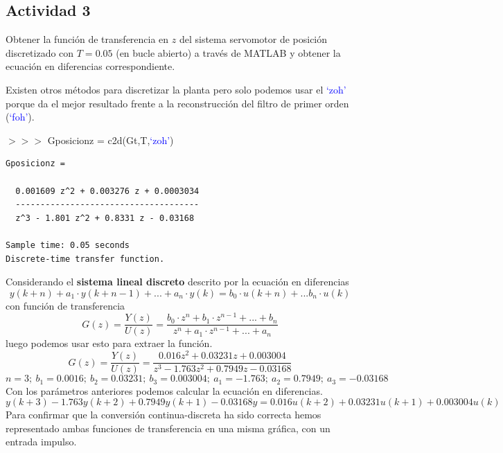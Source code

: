 \subsection{Actividad 3}
Obtener la función de transferencia en $z$ del sistema
servomotor de posición discretizado con $T=0.05$ (en bucle abierto) a
través de \textsc{MATLAB} y obtener la ecuación en diferencias
correspondiente.

Existen otros métodos para discretizar la planta pero solo podemos
usar el \textcolor{blue}{`zoh'} porque da el mejor resultado frente a
la reconstrucción del filtro de primer orden
(\textcolor{blue}{`foh'}).

\begin{tcolorbox}[sharp corners, colframe=bluebox, title= Función de
  transferencia en $z$.]
 $>>>$ Gposicionz = c2d(Gt,T,\textcolor{blue}{`zoh'})
  \vspace*{0.5em}
  \begin{tcolorbox}[sharp corners, colback = white]
    \color{gray}
\begin{verbatim}
Gposicionz =
 
  0.001609 z^2 + 0.003276 z + 0.0003034
  -------------------------------------
  z^3 - 1.801 z^2 + 0.8331 z - 0.03168
 
Sample time: 0.05 seconds
Discrete-time transfer function.
\end{verbatim}
  \end{tcolorbox}%
  \vspace*{0.5em}
\end{tcolorbox}%

Considerando el \textbf{sistema lineal discreto} descrito por la
ecuación en diferencias
\begin{equation}
  y(k+n) + a_1 \cdot y(k+n-1)+...+a_n \cdot y(k) = b_0 \cdot
  u(k+n)+...b_n\cdot u(k)
\end{equation}
con función de transferencia
\begin{equation}
  G(z) = \dfrac{Y(z)}{U(z)} = \dfrac{b_0 \cdot z^n + b_1 \cdot z^{n-1}
  + ... + b_n}{z^n+a_1 \cdot z^{n-1}+ ... + a_n}
\end{equation}
luego podemos usar esto para extraer la función.
\begin{equation}
  G(z) = \dfrac{Y(z)}{U(z)} = \dfrac{0.016 z^2+0.03231z+0.003004}{z^3-1.763z^2+0.7949z-0.03168}
\end{equation}
\begin{equation*}
  n = 3; \ b_1 = 0.0016; \ b_ 2 = 0.03231;\ b_3 = 0.003004;\ a_1 =
  -1.763;\ a_2 = 0.7949; \ a_3 = -0.03168
\end{equation*}
Con los parámetros anteriores podemos calcular la ecuación en
diferencias.
\begin{equation}
  y(k+3)-1.763y(k+2)+0.7949y(k+1)-0.03168y = 0.016u(k+2)+0.03231u(k+1)+0.003004u(k)
\end{equation}
Para confirmar que la conversión continua-discreta ha sido correcta
hemos representado ambas funciones de transferencia en una misma
gráfica, con un entrada impulso.

